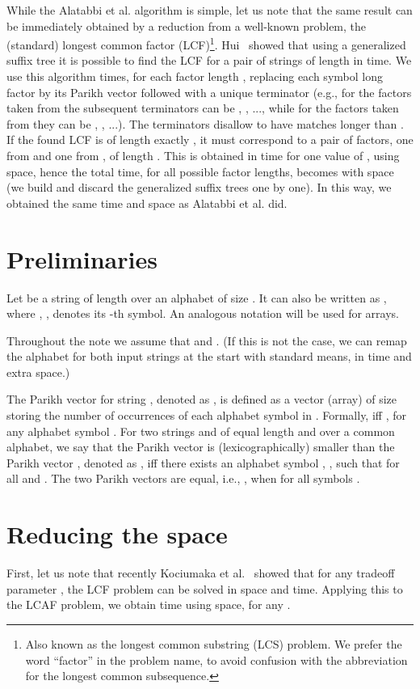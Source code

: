 \documentclass{llncs}
\begin{document}
While the Alatabbi et al. algorithm is simple, 
let us note that the same result can be
immediately obtained by a reduction from a well-known problem, 
the (standard) longest common factor (LCF)\footnote{Also known 
as the longest common substring (LCS) problem. 
We prefer the word ``factor'' in the problem name, to avoid confusion 
with the abbreviation for the longest common subsequence.}.
Hui~\cite{H1992} showed that using a generalized suffix tree it is possible 
to find the LCF for a pair of strings of length  in  time.
We use this algorithm  times, for each factor length , 
replacing each  symbol long factor by its Parikh vector 
followed with a unique terminator (e.g., for the factors taken from  
the subsequent terminators can be 
, , ..., 
while 
for the factors taken from  they can be 
, , ...).
The terminators disallow to have 
matches 
longer than .
If the found LCF is of length exactly , 
it must correspond to a pair of factors, one from  and one from , 
of length .
This is obtained in  time for one value of , 
using  space, hence the total time, 
for all possible factor lengths, becomes  with 
 space 
(we build and discard the generalized suffix trees one by one).
In this way, we obtained the same time and space as Alatabbi et al. did.


\section{Preliminaries}
Let  be a string of length  over an alphabet  of 
size .
It can also be written as , where , , 
denotes its -th symbol.
An analogous notation will be used for arrays.

Throughout the note we assume that  and 
.
(If this is not the case, we can remap the alphabet for both 
input strings at the start with standard means, 
in  time and  extra space.)

The Parikh vector for string , 
denoted as , 
is defined as a vector (array) of size  storing the number 
of occurrences of each alphabet symbol in .
Formally,  iff , for any alphabet 
symbol .
For two strings  and  of equal length and over a common alphabet,
we say that the Parikh vector  is (lexicographically) smaller 
than the Parikh vector , denoted as , 
iff there exists an alphabet symbol , , such that 
 for all  and .
The two Parikh vectors are equal, i.e., , 
when  for all symbols .


\section{Reducing the space}
\noindent
First, let us note that recently Kociumaka et al.~\cite{KSV2014}
showed that for any tradeoff parameter , 
the LCF problem can be solved in  space and  time.
Applying this to the LCAF problem, we obtain 
 time using  space, 
for any .
\end{document}
